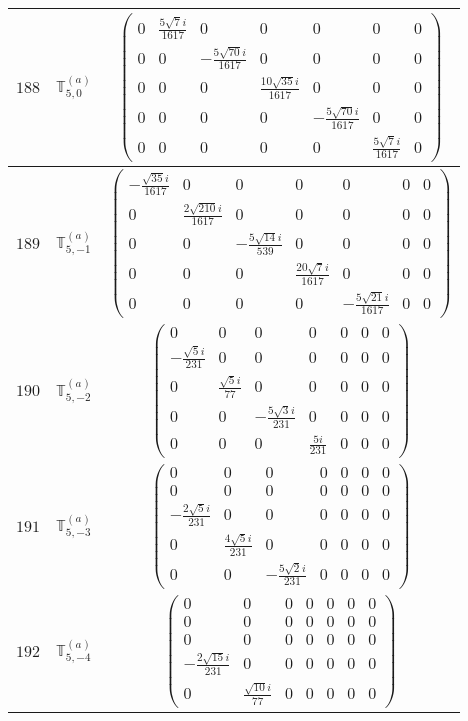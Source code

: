 \documentclass[fleqn,8pt,landscape]{jsarticle}
\begin{document}
\begin{center}
\begin{longtable}{ccc}
$ 188 $ & $ \mathbb{T}_{5,0}^{(a)} $ & $ \begin{pmatrix} 0 & \frac{5 \sqrt{7} i}{1617} & 0 & 0 & 0 & 0 & 0 \\ 0 & 0 & - \frac{5 \sqrt{70} i}{1617} & 0 & 0 & 0 & 0 \\ 0 & 0 & 0 & \frac{10 \sqrt{35} i}{1617} & 0 & 0 & 0 \\ 0 & 0 & 0 & 0 & - \frac{5 \sqrt{70} i}{1617} & 0 & 0 \\ 0 & 0 & 0 & 0 & 0 & \frac{5 \sqrt{7} i}{1617} & 0 \end{pmatrix} $ \\ \hline
$ 189 $ & $ \mathbb{T}_{5,-1}^{(a)} $ & $ \begin{pmatrix} - \frac{\sqrt{35} i}{1617} & 0 & 0 & 0 & 0 & 0 & 0 \\ 0 & \frac{2 \sqrt{210} i}{1617} & 0 & 0 & 0 & 0 & 0 \\ 0 & 0 & - \frac{5 \sqrt{14} i}{539} & 0 & 0 & 0 & 0 \\ 0 & 0 & 0 & \frac{20 \sqrt{7} i}{1617} & 0 & 0 & 0 \\ 0 & 0 & 0 & 0 & - \frac{5 \sqrt{21} i}{1617} & 0 & 0 \end{pmatrix} $ \\ \hline
$ 190 $ & $ \mathbb{T}_{5,-2}^{(a)} $ & $ \begin{pmatrix} 0 & 0 & 0 & 0 & 0 & 0 & 0 \\ - \frac{\sqrt{5} i}{231} & 0 & 0 & 0 & 0 & 0 & 0 \\ 0 & \frac{\sqrt{5} i}{77} & 0 & 0 & 0 & 0 & 0 \\ 0 & 0 & - \frac{5 \sqrt{3} i}{231} & 0 & 0 & 0 & 0 \\ 0 & 0 & 0 & \frac{5 i}{231} & 0 & 0 & 0 \end{pmatrix} $ \\ \hline
$ 191 $ & $ \mathbb{T}_{5,-3}^{(a)} $ & $ \begin{pmatrix} 0 & 0 & 0 & 0 & 0 & 0 & 0 \\ 0 & 0 & 0 & 0 & 0 & 0 & 0 \\ - \frac{2 \sqrt{5} i}{231} & 0 & 0 & 0 & 0 & 0 & 0 \\ 0 & \frac{4 \sqrt{5} i}{231} & 0 & 0 & 0 & 0 & 0 \\ 0 & 0 & - \frac{5 \sqrt{2} i}{231} & 0 & 0 & 0 & 0 \end{pmatrix} $ \\ \hline
$ 192 $ & $ \mathbb{T}_{5,-4}^{(a)} $ & $ \begin{pmatrix} 0 & 0 & 0 & 0 & 0 & 0 & 0 \\ 0 & 0 & 0 & 0 & 0 & 0 & 0 \\ 0 & 0 & 0 & 0 & 0 & 0 & 0 \\ - \frac{2 \sqrt{15} i}{231} & 0 & 0 & 0 & 0 & 0 & 0 \\ 0 & \frac{\sqrt{10} i}{77} & 0 & 0 & 0 & 0 & 0 \end{pmatrix} $ \\ \hline

\end{longtable}
\end{center}
\end{document}

